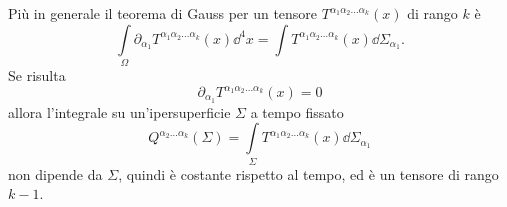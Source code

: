 Più in generale il teorema di Gauss per un tensore
$T^{\alpha_{1}\alpha_{2}\dots\alpha_{k}}(x)$ di rango $k$ è
\begin{equation}
  \int\limits_{\Omega} \partial_{\alpha_{1}}
  T^{\alpha_{1}\alpha_{2}\dots\alpha_{k}}(x) \dd^{4} x = \int
  T^{\alpha_{1}\alpha_{2}\dots\alpha_{k}}(x) \dd\Sigma_{\alpha_{1}}.
\end{equation}
Se risulta
\begin{equation}
  \partial_{\alpha_{1}} T^{\alpha_{1}\alpha_{2}\dots\alpha_{k}}(x) = 0
\end{equation}
allora l'integrale su un'ipersuperficie $\Sigma$ a tempo fissato
\begin{equation}
  Q^{\alpha_{2}\dots\alpha_{k}}(\Sigma) = \int\limits_{\Sigma}
  T^{\alpha_{1}\alpha_{2}\dots\alpha_{k}}(x) \dd\Sigma_{\alpha_{1}}
\end{equation}
non dipende da $\Sigma$, quindi è costante rispetto al tempo, ed è un tensore di
rango $k-1$.

